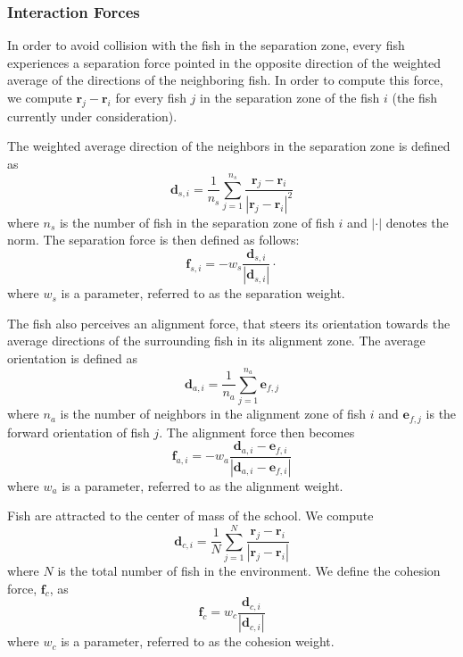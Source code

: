 \documentclass[11pt,a4paper]{article}
\begin{document}
\subsubsection{Interaction Forces} \label{sec:interactionF}
In order to avoid collision with the fish in the separation zone, every fish experiences a separation force pointed in the opposite direction of the weighted average of the directions of the neighboring fish. In order to compute this force, we compute $\mathbf{r}_j - \mathbf{r}_i$ for every fish $j$ in the separation zone of the fish $i$ (the fish currently under consideration). 
 
The weighted average direction of the neighbors in the separation zone is defined as
$$
\mathbf{d}_{s,i} = \frac{1}{n_s} \displaystyle\sum\limits_{j = 1}^{n_s} \frac{\mathbf{r}_j - \mathbf{r}_i}{\left|\mathbf{r}_j - \mathbf{r}_i\right|^2}
$$
where $n_s$ is the number of fish in the separation zone of fish $i$ and $|\cdot|$ denotes the norm.  
The separation force is then defined as follows:
\begin{equation}
\mathbf{f}_{s,i} = - w_s \frac{\mathbf{d}_{s,i}}{\left| \mathbf{d}_{s,i} \right|} \cdot 
\label{eq:fs}
\end{equation}
where $w_s$ is a parameter, referred to as the separation weight.

The fish also perceives an alignment force, that steers its orientation towards the average directions of the surrounding fish in its alignment zone. The average orientation is defined as
$$
\mathbf{d}_{a, i} = \frac{1}{n_a} \displaystyle\sum\limits_{j = 1}^{n_a} \mathbf{e}_{f,j}
$$
where $n_a$ is the number of neighbors in the alignment zone of fish $i$ and $\mathbf{e}_{f,j}$ is the forward orientation of fish $j$. The alignment force then becomes
\begin{equation}
\mathbf{f}_{a,i} = - w_a \frac{\mathbf{d}_{a,i} - \mathbf{e}_{f,i}}{\left|\mathbf{d}_{a,i} - \mathbf{e}_{f,i} \right|}
\label{eq:fa}
\end{equation}
where $w_a$ is a parameter, referred to as the alignment weight.

Fish are attracted to the center of mass of the school. We compute
$$
\mathbf{d}_{c,i} = \frac{1}{N} \displaystyle\sum\limits_{j = 1}^{N} \frac{\mathbf{r}_j - \mathbf{r}_i}{\left|\mathbf{r}_j - \mathbf{r}_i\right|}
$$
where $N$ is the total number of fish in the environment. We define the cohesion force, $\mathbf{f}_c$, as
\begin{equation}
\mathbf{f}_c = w_c \frac{\mathbf{d}_{c,i}}{\left|\mathbf{d}_{c,i} \right|}
\label{eq:fc}
\end{equation}
where $w_c$ is a parameter, referred to as the cohesion weight. 
\end{document}
